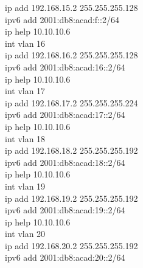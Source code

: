 \documentclass[a4paper, 12pt]{article}
\begin{document}
{\hspace*{2cm}ip add 192.168.15.2 255.255.255.128\\
\hspace*{2cm}ipv6 add 2001:db8:acad:f::2/64\\
\hspace*{2cm}ip help 10.10.10.6\\
\hspace*{2cm}int vlan 16\\
\hspace*{2cm}ip add 192.168.16.2 255.255.255.128\\
\hspace*{2cm}ipv6 add 2001:db8:acad:16::2/64\\
\hspace*{2cm}ip help 10.10.10.6\\
\hspace*{2cm}int vlan 17\\
\hspace*{2cm}ip add 192.168.17.2 255.255.255.224\\
\hspace*{2cm}ipv6 add 2001:db8:acad:17::2/64\\
\hspace*{2cm}ip help 10.10.10.6\\
\hspace*{2cm}int vlan 18\\
\hspace*{2cm}ip add 192.168.18.2 255.255.255.192\\
\hspace*{2cm}ipv6 add 2001:db8:acad:18::2/64\\
\hspace*{2cm}ip help 10.10.10.6\\
\hspace*{2cm}int vlan 19\\
\hspace*{2cm}ip add 192.168.19.2 255.255.255.192\\
\hspace*{2cm}ipv6 add 2001:db8:acad:19::2/64\\
\hspace*{2cm}ip help 10.10.10.6\\
\hspace*{2cm}int vlan 20\\
\hspace*{2cm}ip add 192.168.20.2 255.255.255.192\\
\hspace*{2cm}ipv6 add 2001:db8:acad:20::2/64\\
}
\end{document}
